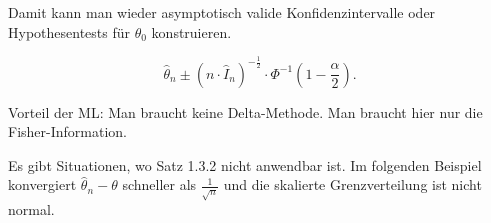 \documentclass[10pt]{article}
\newenvironment{BSP}[1][]
{\begin{Beispiel}[frametitle=#1]}{\end{Beispiel}}
\begin{document}
	Damit kann man wieder asymptotisch valide Konfidenzintervalle oder Hypothesentests für $\theta_0$ konstruieren. 
	\begin{BSP}[Beispiel 1.3.10 (Konfidenzintervall für $\theta_0$)]
		\begin{equation*}
			\hat{\theta}_n \pm (n \cdot \hat{I}_n)^{-\frac{1}{2}} \cdot \Phi^{-1}\left(1-\frac{\alpha}{2}\right).
		\end{equation*}
	\end{BSP}
	Vorteil der ML: Man braucht keine Delta-Methode. Man braucht hier nur die Fisher-Information. 
	
	Es gibt Situationen, wo Satz 1.3.2 nicht anwendbar ist. Im folgenden Beispiel konvergiert $\hat{\theta}_n - \theta$ schneller als $\frac{1}{\sqrt{n}}$ und die skalierte Grenzverteilung ist nicht normal. 
	
\end{document}
